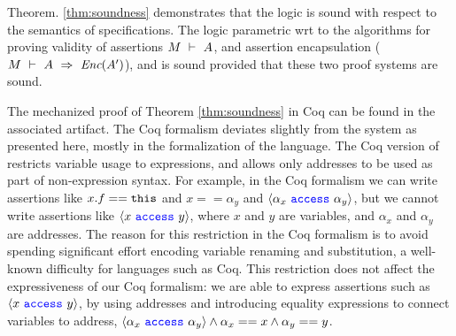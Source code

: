 Theorem. \ref{thm:soundness} demonstrates 
 that the   \Nec logic is sound with respect to the semantics of \Nec specifications.
 The \Nec logic parametric wrt to the algorithms for proving validity of assertions
 $M\ \vdash\ A$, and 
 assertion encapsulation ($M\ \vdash\ A\ \Rightarrow\ \textit{Enc}(A')$), and is sound
 provided that these two proof systems are sound.



The mechanized  proof of Theorem \ref{thm:soundness} in Coq 
can be found in the associated artifact. 
The   Coq formalism deviates slightly from the system as
presented here,  mostly in the formalization of the 
\SpecO language. The Coq version of \SpecO restricts variable usage to expressions, and allows only addresses to 
be used as part of non-expression syntax. 
For example, in the Coq formalism
we can write assertions like $x.f=={\texttt{this}}$ and
$x==\alpha_y$ and  $\langle \alpha_x\ {\color{blue}\texttt{access}}\ \alpha_y \rangle$, but we cannot write assertions 
like $\langle x\ {\color{blue}\texttt{access}}\ y \rangle$, where $x$ and $y$ are variables, and $\alpha_x$ and $\alpha_y$ are
addresses.
The reason for this restriction in the Coq formalism is to avoid spending %
significant effort encoding variable
renaming and substitution, a well-known difficulty for languages such as Coq. 
This restriction does not affect the expressiveness of %
our  Coq formalism: we are
able to express assertions such as $\langle x\ {\color{blue}\texttt{access}}\ y \rangle$, by using addresses and introducing equality expressions %
to connect variables to address, \ie
 $\langle \alpha_x\ {\color{blue}\texttt{access}}\ \alpha_y \rangle \wedge \alpha_x == x \wedge \alpha_y == y$.
